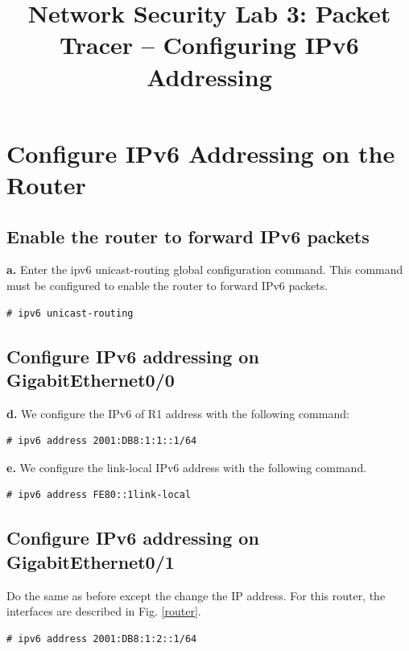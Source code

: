 \documentclass[conference]{IEEEtran}
\begin{document}
\title{Network Security Lab 3: Packet Tracer – Configuring IPv6 Addressing}

\author{
}

\maketitle

\section{Configure IPv6 Addressing on the Router}

\subsection{Enable the router to forward IPv6 packets}

\textbf{a.} Enter the ipv6 unicast-routing global configuration command. This command must be configured to enable the router to forward IPv6 packets.
\begin{verbatim}
# ipv6 unicast-routing
\end{verbatim}

\subsection{Configure IPv6 addressing on GigabitEthernet0/0}

\textbf{d.} We configure the IPv6 of R1 address with the following command:
\begin{verbatim}
# ipv6 address 2001:DB8:1:1::1/64
\end{verbatim}

\textbf{e.} We configure the link-local IPv6 address with the following command.
\begin{verbatim}
# ipv6 address FE80::1link-local
\end{verbatim}

\subsection{Configure IPv6 addressing on GigabitEthernet0/1}
Do the same as before except the change the IP address. For this router, the interfaces are described in Fig. \ref{router}.
\begin{verbatim}
# ipv6 address 2001:DB8:1:2::1/64
\end{verbatim}
\end{document}
